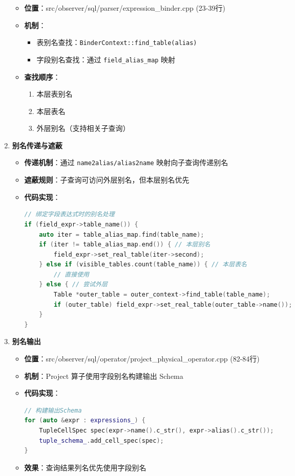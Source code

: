\documentclass[a4paper, 12pt]{article}
\begin{document}
\begin{enumerate}
\begin{itemize}
        \item \textbf{位置}：src/observer/sql/parser/expression\_binder.cpp (23-39行)
        \item \textbf{机制}：
        \begin{itemize}
            \item 表别名查找：\texttt{BinderContext::find\_table(alias)}
            \item 字段别名查找：通过 \texttt{field\_alias\_map} 映射
        \end{itemize}
        \item \textbf{查找顺序}：
        
\begin{enumerate}
            \item 本层表别名
            \item 本层表名
            \item 外层别名（支持相关子查询）
        \end{enumerate}
    \end{itemize}

    \item \textbf{别名传递与遮蔽}
    
\begin{itemize}
        \item \textbf{传递机制}：通过 \texttt{name2alias/alias2name} 映射向子查询传递别名
        \item \textbf{遮蔽规则}：子查询可访问外层别名，但本层别名优先
        \item \textbf{代码实现}：
        \begin{lstlisting}[language=C++]
// 绑定字段表达式时的别名处理
if (field_expr->table_name()) {
    auto iter = table_alias_map.find(table_name);
    if (iter != table_alias_map.end()) { // 本层别名
        field_expr->set_real_table(iter->second);
    } else if (visible_tables.count(table_name)) { // 本层表名
        // 直接使用
    } else { // 尝试外层
        Table *outer_table = outer_context->find_table(table_name);
        if (outer_table) field_expr->set_real_table(outer_table->name());
    }
}
        \end{lstlisting}
    \end{itemize}

    \item \textbf{别名输出}
    
\begin{itemize}
        \item \textbf{位置}：src/observer/sql/operator/project\_physical\_operator.cpp (82-84行)
        \item \textbf{机制}：Project 算子使用字段别名构建输出 Schema
        \item \textbf{代码实现}：
        \begin{lstlisting}[language=C++]
// 构建输出Schema
for (auto &expr : expressions_) {
    TupleCellSpec spec(expr->name().c_str(), expr->alias().c_str());
    tuple_schema_.add_cell_spec(spec);
}
        \end{lstlisting}
        \item \textbf{效果}：查询结果列名优先使用字段别名
        

\end{itemize}
\end{enumerate}
\end{document}
